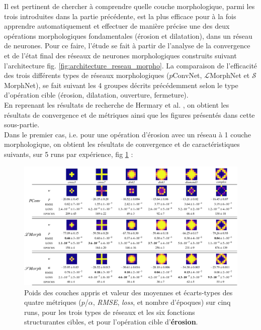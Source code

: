 Il est pertinent de chercher à comprendre quelle couche morphologique, parmi les trois introduites dans la partie précédente, est la plus efficace pour à la fois apprendre automatiquement et effectuer de manière précise une des deux opérations morphologiques fondamentales (érosion et dilatation), dans un réseau de neurones. Pour ce faire, l'étude se fait à partir de l'analyse de la convergence et de l'état final des réseaux de neurones morphologiques construits suivant l'architecture fig. \ref{fig:architecture_reseau_morpho}. La comparaison de l'efficacité des trois différents types de réseaux morphologiques ($p$ConvNet, $\mathcal{L}$MorphNet et $\mathcal{S}$MorphNet), se fait suivant les 4 groupes décrits précédemment selon le type d'opération cible (érosion, dilatation, ouverture, fermeture). \\

\vspace{-1.0mm}
\noindent En reprenant les résultats de recherche de Hermary et al. \cite{Hermary_2022}, on obtient les résultats de convergence et de métriques ainsi que les figures présentés dans cette sous-partie. \\

\vspace{0.0mm}
Dans le premier cas, i.e. pour une opération d'érosion avec un réseau à 1 couche morphologique, on obtient les résultats de convergence et de caractéristiques suivants, sur 5 runs par expérience, fig \ref{fig:art_resultats_erosion} :

\vspace{5.0mm}
\begin{figure}[ht]
  \begin{center}
    \includegraphics[width=1.00\textwidth]{parts/2-etat_de_lart/D-efficacite_des_reseaux_existant/figures/art_erosion.png}
    \vspace{-2.0mm}
    \caption{ \centering Poids des couches appris et valeur des moyennes et écarts-types des quatre métriques ($p$/$\alpha$, \textit{RMSE}, \textit{loss}, et nombre d'époques) sur cinq runs, pour les trois types de réseaux et les six fonctions structurantes cibles, et pour l'opération cible d'\textbf{érosion}.}
    \label{fig:art_resultats_erosion}
  \end{center}
\end{figure}


